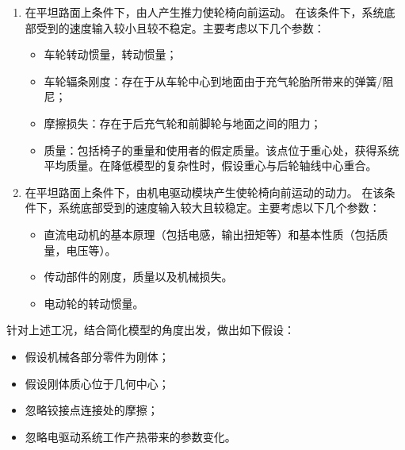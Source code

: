 \begin{enumerate}
	\item 在平坦路面上条件下，由人产生推力使轮椅向前运动。
	在该条件下，系统底部受到的速度输入较小且较不稳定。主要考虑以下几个参数：
	\begin{itemize}
		\item 车轮转动惯量，转动惯量；
		
		\item 车轮辐条刚度：存在于从车轮中心到地面由于充气轮胎所带来的弹簧/阻尼；
		
		\item 摩擦损失：存在于后充气轮和前脚轮与地面之间的阻力；
		
		\item 质量：包括椅子的重量和使用者的假定质量。该点位于重心处，获得系统平均质量。在降低模型的复杂性时，假设重心与后轮轴线中心重合。
	\end{itemize}
	
	\item 在平坦路面上条件下，由机电驱动模块产生使轮椅向前运动的动力。
	在该条件下，系统底部受到的速度输入较大且较稳定。主要考虑以下几个参数：
	\begin{itemize}
		\item 直流电动机的基本原理（包括电感，输出扭矩等）和基本性质（包括质量，电压等）。
		
		\item 传动部件的刚度，质量以及机械损失。
		
		\item 电动轮的转动惯量。
	\end{itemize}
	
\end{enumerate}



针对上述工况，结合简化模型的角度出发，做出如下假设：

\begin{itemize}
	
	\item 假设机械各部分零件为刚体；
	
	\item 假设刚体质心位于几何中心；
	
	\item 忽略铰接点连接处的摩擦；
	
	\item 忽略电驱动系统工作产热带来的参数变化。
	
\end{itemize}



